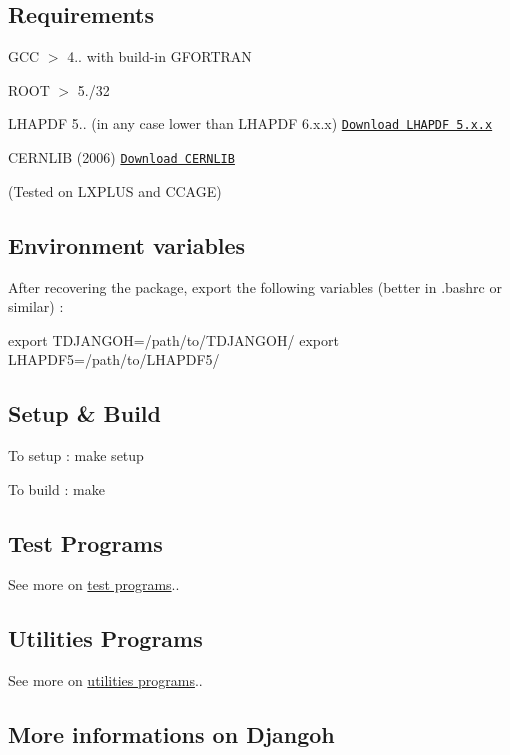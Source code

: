 \subsection*{Requirements}

G\+CC $>$ 4.. with build-\/in G\+F\+O\+R\+T\+R\+AN

R\+O\+OT $>$ 5./32

L\+H\+A\+P\+DF 5.. (in any case lower than L\+H\+A\+P\+DF 6.\+x.\+x) \href{https://www.hepforge.org/downloads/lhapdf}{\tt Download L\+H\+A\+P\+DF 5.\+x.\+x}

C\+E\+R\+N\+L\+IB (2006) \href{http://cernlib.web.cern.ch/cernlib/version.html}{\tt Download C\+E\+R\+N\+L\+IB}

(Tested on L\+X\+P\+L\+US and C\+C\+A\+GE)

\subsection*{Environment variables}

After recovering the package, export the following variables (better in .bashrc or similar) \+:

{\ttfamily export T\+D\+J\+A\+N\+G\+OH=/path/to/\+T\+D\+J\+A\+N\+G\+O\+H/} {\ttfamily export L\+H\+A\+P\+D\+F5=/path/to/\+L\+H\+A\+P\+D\+F5/}

\subsection*{Setup \& Build}

To setup \+: {\ttfamily make setup}

To build \+: {\ttfamily make}

\subsection*{Test Programs}

See more on \hyperlink{md_test__t_e_s_t_p_r_o_g_r_a_m_s}{test programs}..

\subsection*{Utilities Programs}

See more on \hyperlink{md_utils__u_t_i_l_s_p_r_o_g_r_a_m_s}{utilities programs}..

\subsection*{More informations on Djangoh}

